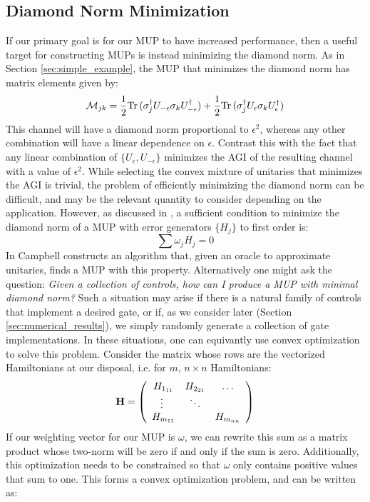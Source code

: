 \documentclass[aps,nofootinbib,pra,notitlepage,twocolumn]{revtex4-1}
\newcommand{\tr}{{\rm Tr\thinspace}}
\begin{document}
\subsection{Diamond Norm Minimization}
\label{sec:small_diamond_norm}
If our primary goal is for our MUP to have increased performance, then a useful target for constructing MUPs is instead minimizing the diamond norm. As in Section \ref{sec:simple_example}, the MUP that minimizes the diamond norm has matrix elements given by:
\begin{equation}\label{eq:balanced}
\mathcal{M}_{jk} = \frac{1}{2}\tr(\sigma_j^{\dagger}U_{-\epsilon}\sigma_kU_{-\epsilon}^{\dagger}) + \frac{1}{2}\tr(\sigma_j^{\dagger}U_{\epsilon}\sigma_kU_{\epsilon}^{\dagger})
\end{equation}
This channel will have a diamond norm proportional to $\epsilon^2$, whereas any other combination will have a linear dependence on $\epsilon$. Contrast this with the fact that any linear combination of $\{U_{\epsilon}, U_{-\epsilon}\}$ minimizes the AGI of the resulting channel with a value of $\epsilon^2$. While selecting the convex mixture of unitaries that minimizes the AGI is  trivial, the problem of efficiently minimizing the diamond norm can be difficult, and may be the relevant quantity to consider depending on the application. However, as discussed in \cite{Campbell2017}, a sufficient condition to minimize the diamond norm of a MUP with error generators $\{H_j\}$ to first order is:
\begin{equation}\label{eq:campbell-condition}
\sum \omega_j H_j = 0
\end{equation}
In \cite{Campbell2017} Campbell constructs an algorithm that, given an oracle to approximate unitaries, finds a MUP with this property. Alternatively one might ask the question: \textit{Given a collection of controls, how can I produce a MUP with minimal diamond norm?} Such a situation may arise if there is a natural family of controls that implement a desired gate, or if, as we consider later (Section \ref{sec:numerical_results}), we simply randomly generate a collection of gate implementations. In these situations, one can equivantly use convex optimization to solve this problem. Consider the matrix whose rows are the vectorized Hamiltonians at our disposal, i.e. for $m$, $n\times n$ Hamiltonians:
\begin{equation}\label{eq:vectorized_hamiltonians}
	\bold{H} = \left(\begin{array}{cccc}
		H_{1_{11}} & H_{2_{21}} & \ldots   \\ 
		\vdots\ & \ddots &    \\
		H_{m_{11}} &  &  H_{m_{nn}} \\ 
	\end{array} 	
	\right)
\end{equation}
If our weighting vector for our MUP is $\omega$, we can rewrite this sum as a matrix product whose two-norm will be zero if and only if the sum is zero. Additionally, this optimization needs to be constrained so that $\omega$ only contains positive values that sum to one. This forms a convex optimization problem, and can be written as:
\end{document}
